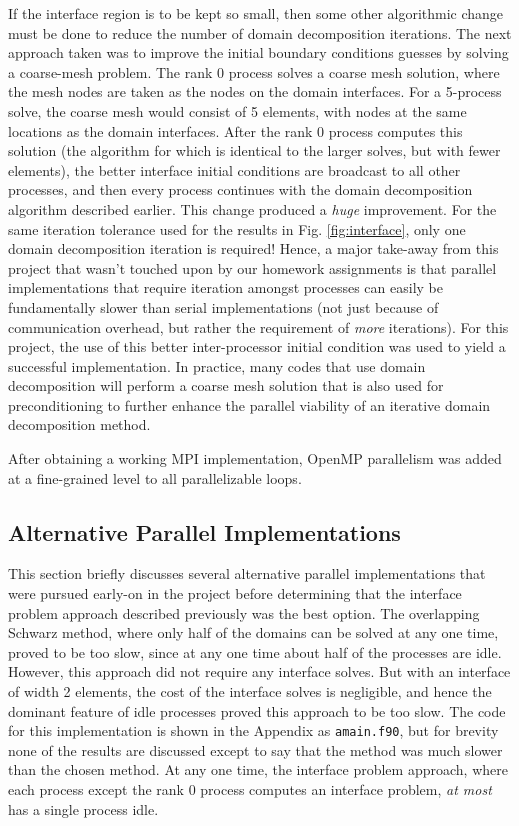 \documentclass[10pt]{article}
\begin{document}
If the interface region is to be kept so small, then some other algorithmic change must be done to reduce the number of domain decomposition iterations. The next approach taken was to improve the initial boundary conditions guesses by solving a coarse-mesh problem. The rank 0 process solves a coarse mesh solution, where the mesh nodes are taken as the nodes on the domain interfaces. For a 5-process solve, the coarse mesh would consist of 5 elements, with nodes at the same locations as the domain interfaces. After the rank 0 process computes this solution (the algorithm for which is identical to the larger solves, but with fewer elements), the better interface initial conditions are broadcast to all other processes, and then every process continues with the domain decomposition algorithm described earlier. This change produced a {\it huge} improvement. For the same iteration tolerance used for the results in Fig. \ref{fig:interface}, only one domain decomposition iteration is required! Hence, a major take-away from this project that wasn't touched upon by our homework assignments is that parallel implementations that require iteration amongst processes can easily be fundamentally slower than serial implementations (not just because of communication overhead, but rather the requirement of {\it more} iterations). For this project, the use of this better inter-processor initial condition was used to yield a successful implementation. In practice, many codes that use domain decomposition will perform a coarse mesh solution that is also used for preconditioning to further enhance the parallel viability of an iterative domain decomposition method.

After obtaining a working MPI implementation, OpenMP parallelism was added at a fine-grained level to all parallelizable loops. 








\subsection{Alternative Parallel Implementations}
This section briefly discusses several alternative parallel implementations that were pursued early-on in the project before determining that the interface problem approach described previously was the best option. The overlapping Schwarz method, where only half of the domains can be solved at any one time, proved to be too slow, since at any one time about half of the processes are idle. However, this approach did not require any interface solves. But with an interface of width 2 elements, the cost of the interface solves is negligible, and hence the dominant feature of idle processes proved this approach to be too slow. The code for this implementation is shown in the Appendix as {\tt amain.f90}, but for brevity none of the results are discussed except to say that the method was much slower than the chosen method. At any one time, the interface problem approach, where each process except the rank 0 process computes an interface problem, {\it at most} has a single process idle.
\end{document}
